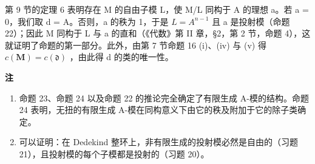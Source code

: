第 9 节的定理 6 表明存在 M 的自由子模 L，使 M/L 同构于 A 的理想 a。若 a = 0，我们取 d = A。否则，a 的秩为 1，于是 \(L = A^{n-1}\) 且 a 是投射模（命题 22）；因此 M 同构于 L 与 a 的直和（《代数》第 II 章，§2，第 2 节，命题 4），这就证明了命题的第一部分。此外，由第 7 节命题 16 (i)、(iv) 与 (v) 得 \(c(\mathbf{M}) = c(\mathfrak{d})\) ，由此得 d 的类的唯一性。

\textbf{注}\par

\begin{enumerate}
\def\labelenumi{(\arabic{enumi})}
\item
  命题 23、命题 24 以及命题 22 的推论完全确定了有限生成 A-模的结构。命题 24 表明，无扭的有限生成 A-模在同构意义下由它的秩及附加于它的除子类确定。
\item
  可以证明：在 Dedekind 整环上，非有限生成的投射模必然是自由的（习题 21），且投射模的每个子模都是投射的（习题 20）。
\end{enumerate}



